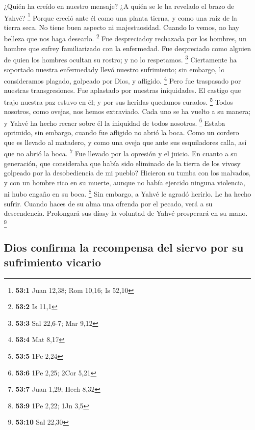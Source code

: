 \begin{paracol}{2}
 ¿Quién ha creído en nuestro mensaje? ¿A quién se le ha
revelado el brazo de Yahvé? \footnote{\textbf{53:1} Juan 12,38; Rom
  10,16; Is 52,10}  Porque creció ante él como una planta
tierna, y como una raíz de la tierra seca. No tiene buen aspecto ni
majestuosidad. Cuando lo vemos, no hay belleza que nos haga desearlo.
\footnote{\textbf{53:2} Is 11,1}  Fue despreciadoy
rechazada por los hombres, un hombre que sufrey familiarizado con la
enfermedad. Fue despreciado como alguien de quien los hombres ocultan su
rostro; y no lo respetamos. \footnote{\textbf{53:3} Sal 22,6-7; Mar 9,12}
 Ciertamente ha soportado nuestra enfermedady llevó
nuestro sufrimiento; sin embargo, lo consideramos plagado, golpeado por
Dios, y afligido. \footnote{\textbf{53:4} Mat 8,17}  Pero
fue traspasado por nuestras transgresiones. Fue aplastado por nuestras
iniquidades. El castigo que trajo nuestra paz estuvo en él; y por sus
heridas quedamos curados. \footnote{\textbf{53:5} 1Pe 2,24}
 Todos nosotros, como ovejas, nos hemos extraviado. Cada
uno se ha vuelto a su manera; y Yahvé ha hecho recaer sobre él la
iniquidad de todos nosotros. \footnote{\textbf{53:6} 1Pe 2,25; 2Cor 5,21}
 Estaba oprimido, sin embargo, cuando fue afligido no
abrió la boca. Como un cordero que es llevado al matadero, y como una
oveja que ante sus esquiladores calla, así que no abrió la boca.
\footnote{\textbf{53:7} Juan 1,29; Hech 8,32}  Fue llevado
por la opresión y el juicio. En cuanto a su generación, que consideraba
que había sido eliminado de la tierra de los vivosy golpeado por la
desobediencia de mi pueblo?  Hicieron su tumba con los
malvados, y con un hombre rico en su muerte, aunque no había ejercido
ninguna violencia, ni hubo engaño en su boca. \footnote{\textbf{53:9}
  1Pe 2,22; 1Jn 3,5}  Sin embargo, a Yahvé le agradó
herirlo. Le ha hecho sufrir. Cuando haces de su alma una ofrenda por el
pecado, verá a su descendencia. Prolongará sus díasy la voluntad de
Yahvé prosperará en su mano. \footnote{\textbf{53:10} Sal 22,30}

\hypertarget{dios-confirma-la-recompensa-del-siervo-por-su-sufrimiento-vicario}{%
\subsection{Dios confirma la recompensa del siervo por su sufrimiento
vicario}\label{dios-confirma-la-recompensa-del-siervo-por-su-sufrimiento-vicario}}


\end{paracol}
